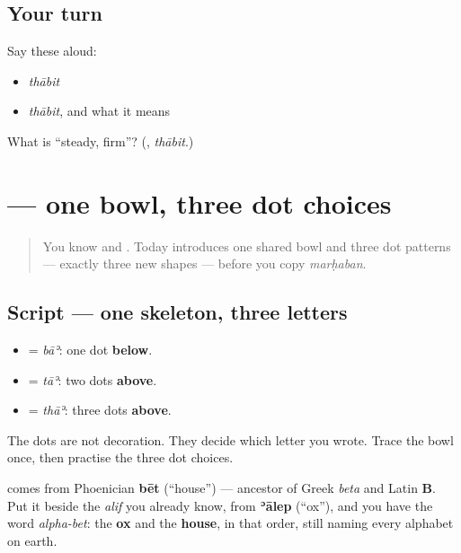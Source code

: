 \subsection*{Your turn}
Say these aloud:

\begin{itemize}
\raggedright
  \item \emph{thābit}
  \item \emph{thābit}, and what it means
\end{itemize}

\begin{tcolorbox}[breakable,colback=teal!4,colframe=teal!35!black,title={Before you move on}]
What is \textquotedblleft{}steady, firm\textquotedblright{}? (\textbf{}, \emph{thābit}.)
\end{tcolorbox}
\section[\texorpdfstring{\ar{ب} \ar{ت} \ar{ث} — \ar{مرحبا} (bāʾ, tāʾ, thāʾ …)}{ب ت ث — مرحبا (bāʾ, tāʾ, thāʾ …)}]{   — one bowl, three dot choices}

\label{lesson:AR-W00-ba-family-marhaba}



\begin{quote}
You know \textbf{} and \textbf{}. Today introduces one shared bowl and three dot patterns — exactly three new shapes — before you copy \emph{marḥaban}.
\end{quote}

\subsection*{Script — one skeleton, three letters}
\begin{itemize}
\raggedright
  \item \textbf{} = \emph{bāʾ}: one dot \textbf{below}.
  \item \textbf{} = \emph{tāʾ}: two dots \textbf{above}.
  \item \textbf{} = \emph{thāʾ}: three dots \textbf{above}.
\end{itemize}

The dots are not decoration. They decide which letter you wrote. Trace the bowl once, then practise the three dot choices.

\textbf{} comes from Phoenician \textbf{bēt} (\textquotedblleft{}house\textquotedblright{}) — ancestor of Greek \emph{beta} and Latin \textbf{B}. Put it beside the \emph{alif} you already know, from \textbf{ʾālep} (\textquotedblleft{}ox\textquotedblright{}), and you have the word \emph{alpha-bet}: the \textbf{ox} and the \textbf{house}, in that order, still naming every alphabet on earth.

